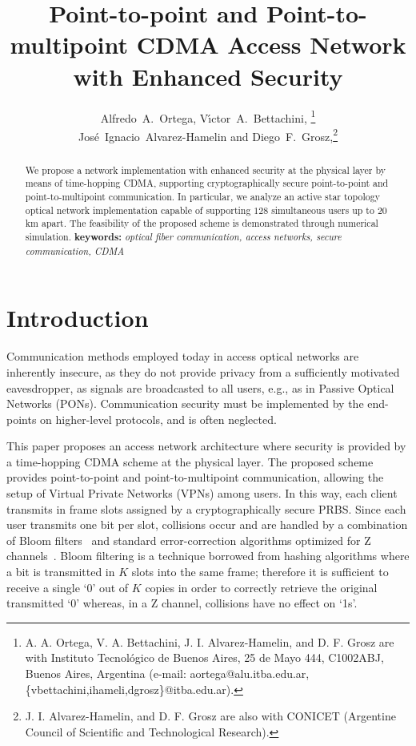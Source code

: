 \documentclass[10pt]{article}
\begin{document}
\title{Point-to-point and Point-to-multipoint CDMA Access Network with Enhanced Security}
\author{
  Alfredo~A.~Ortega,
  V\'{\i}ctor~A.~Bettachini,
  \thanks{A. A. Ortega, V. A. Bettachini, J. I. Alvarez-Hamelin, and D.
F. Grosz are with Instituto Tecnol\'ogico de Buenos Aires, 25 de Mayo
444, C1002ABJ, Buenos Aires, Argentina (e-mail: aortega@alu.itba.edu.ar,
\{vbettachini,ihameli,dgrosz\}@itba.edu.ar).}\\
  Jos\'e~Ignacio~Alvarez-Hamelin
  and Diego~F.~Grosz,\thanks{J. I. Alvarez-Hamelin, and D. F. Grosz are also with CONICET
(Argentine Council of Scientific and Technological Research).}
}
\maketitle
\begin{abstract}
We propose a network implementation with enhanced security at the physical layer by means of time-hopping CDMA, supporting cryptographically secure point-to-point and point-to-multipoint communication.
In particular, we analyze an active star topology optical network implementation capable of supporting $128$ simultaneous users up to $20$ km apart.
The feasibility of the proposed scheme is demonstrated through numerical simulation.
{\bf keywords:} {\em optical fiber communication, access networks,
secure communication, CDMA}
\end{abstract}
\section{Introduction}

Communication methods employed today in access optical
networks are inherently insecure, as they do not provide privacy from a
sufficiently motivated eavesdropper, as signals are broadcasted to all
users, e.g., as in Passive Optical Networks (PONs).
Communication security must be implemented by the end-points on higher-level protocols, and is often neglected.

This paper proposes an access network architecture where security is provided by a time-hopping CDMA scheme at the physical layer.
The proposed scheme provides point-to-point and point-to-multipoint
communication, allowing the setup of Virtual Private Networks (VPNs)
among users.
In this way, each client transmits in frame slots assigned by a
cryptographically secure PRBS.  Since each user transmits one bit per
slot, collisions occur and are
handled by a combination of Bloom
filters~\cite{Bloom70space/timetrade-offs} and
standard error-correction algorithms optimized for Z channels~\cite{Golomb:80}.
Bloom filtering is a technique borrowed from hashing algorithms where a
bit is transmitted in $K$ slots into the same frame; therefore it is
sufficient to receive a single `0' out of $K$ copies in order to
correctly retrieve the original transmitted `0' whereas, in a Z
channel, collisions have no effect on `1s'.
\end{document}
